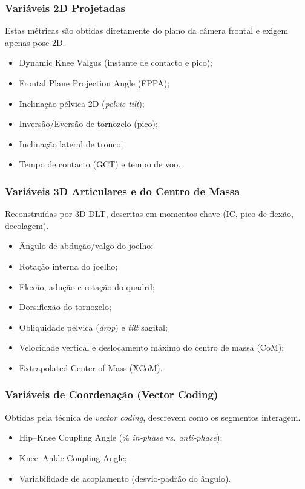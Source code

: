 \documentclass{article}
\begin{document}
\subsubsection{Variáveis 2D Projetadas}
Estas métricas são obtidas diretamente do plano da câmera frontal e exigem apenas pose 2D.%
\begin{itemize}
    \item Dynamic Knee Valgus (instante de contacto e pico);
    \item Frontal Plane Projection Angle (FPPA);
    \item Inclinação pélvica 2D (\emph{pelvic tilt});
    \item Inversão/Eversão de tornozelo (pico);
    \item Inclinação lateral de tronco;
    \item Tempo de contacto (GCT) e tempo de voo.
\end{itemize}

\subsubsection{Variáveis 3D Articulares e do Centro de Massa}
Reconstruídas por 3D‑DLT, descritas em momentos‑chave (IC, pico de flexão, decolagem).%

\begin{itemize}
    \item Ângulo de abdução/valgo do joelho;
    \item Rotação interna do joelho;
    \item Flexão, adução e rotação do quadril;
    \item Dorsiflexão do tornozelo;
    \item Obliquidade pélvica (\emph{drop}) e \emph{tilt} sagital;
    \item Velocidade vertical e deslocamento máximo do centro de massa (CoM);
    \item Extrapolated Center of Mass (XCoM).
\end{itemize}

\subsubsection{Variáveis de Coordenação (Vector Coding)}
Obtidas pela técnica de \emph{vector coding}, descrevem como os segmentos interagem.%

\begin{itemize}
    \item Hip–Knee Coupling Angle (\% \emph{in‑phase} vs. \emph{anti‑phase});
    \item Knee–Ankle Coupling Angle;
    \item Variabilidade de acoplamento (desvio‑padrão do ângulo).
\end{itemize}
\end{document}
